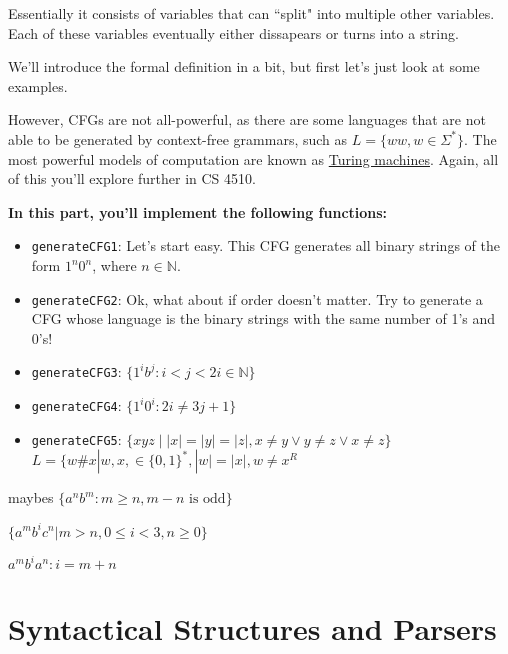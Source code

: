 \documentclass{article}
\begin{document}
    Essentially it consists of variables that can ``split" into multiple other variables. Each of these variables eventually either dissapears or turns into a string.
    
    
    We'll introduce the formal definition in a bit, but first let's just look at some examples. 


    However, CFGs are not all-powerful, as there are some languages that are not able to be generated by context-free grammars, such as $L = \{ww, w \in \Sigma^{*}\}$. The most powerful models of computation are known as \href{https://www.google.com/doodles/alan-turings-100th-birthday}{Turing machines}. Again, all of this you'll explore further in CS 4510.

\begin{tcolorbox}[enhanced,interior style={top color=Dandelion!20,bottom color=Dandelion!30}]
    \textbf{In this part, you'll implement the following functions:}
    \begin{itemize}
        \item \lstinline{generateCFG1}: Let's start easy. This CFG generates all binary strings of the form $1^{n}0^{n}$, where $n \in \mathbb{N}$.
        \item \lstinline{generateCFG2}: Ok, what about if order doesn't matter. Try to generate a CFG whose language is the binary strings with the same number of 1's and 0's!
        \item \lstinline{generateCFG3}: $\{1^{i}b^{j} : i < j < 2i \in \mathbb{N}\}$
        \item \lstinline{generateCFG4}: $\{1^{i}0^{i} : 2i \ne 3j + 1\}$
        \item \lstinline{generateCFG5}: $\{xyz \mid |x|=|y|=|z|, x\neq y \lor y \neq z \lor x \neq z\}$
        $ L = \{w\#x | w, x, \in \{0, 1\}^{*}, |w| = |x|, w \ne x^{R}$
    \end{itemize}
\end{tcolorbox}

maybes
$\{a^{n}b^{m} : m \ge n, m - n \text{ is odd}\}$

$\{a^{m}b^{i}c^{n} | m > n, 0 \le i < 3, n \ge 0\}$

$a^{m}b^{i}a^{n} : i = m + n$



\section*{Syntactical Structures and Parsers}
\end{document}
